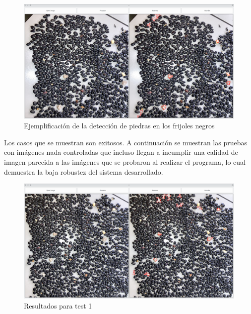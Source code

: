 \documentclass[conference]{IEEEtran}
\begin{document}
    \begin{figure}[H]
        \centering
        \includegraphics[width=\breite\linewidth]{images/negros.png}
        \caption{Ejemplificación de la detección de piedras en los frijoles negros}
        \label{fig:res3}
    \end{figure}

    Los casos que se muestran son exitosos. A continuación se muestran las pruebas con imágenes nada controladas que incluso llegan a incumplir una calidad de imagen parecida a las imágenes que se probaron al realizar el programa, lo cual demuestra la baja robustez del sistema desarrollado.

        \begin{figure}[H]
            \centering
            \includegraphics[width=\breite\linewidth]{images/test1.png}
            \caption{Resultados para test 1}
            \label{fig:test1}
        \end{figure}
\end{document}
